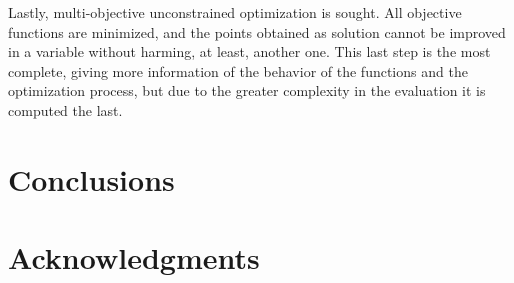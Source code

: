 \documentclass[cmfonts]{witpress}
\begin{document}
Lastly, multi-objective unconstrained optimization is sought. All objective functions are minimized, and the points obtained as solution cannot be improved in a variable without harming, at least, another one. This last step is the most complete, giving more information of the behavior of the functions and the optimization process, but due to the greater complexity in the evaluation it is computed the last.


\section{Conclusions}
\section{Acknowledgments}




\end{document}
